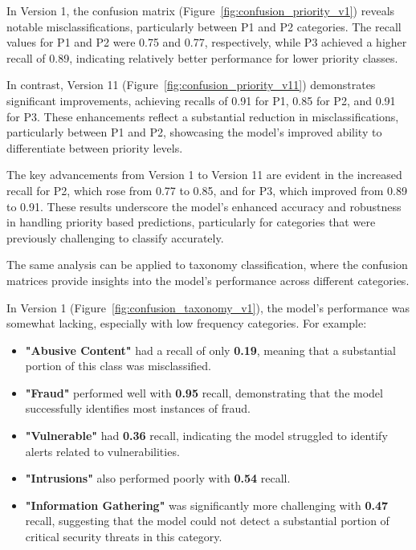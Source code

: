 In Version 1, the confusion matrix (Figure~\ref{fig:confusion_priority_v1}) reveals notable misclassifications, particularly between P1 and P2 categories. 
The recall values for P1 and P2 were 0.75 and 0.77, respectively, while P3 achieved a higher recall of 0.89, indicating relatively better performance for lower priority classes. 

In contrast, Version 11 (Figure~\ref{fig:confusion_priority_v11}) demonstrates significant improvements, achieving recalls of 0.91 for P1, 0.85 for P2, and 0.91 for P3. 
These enhancements reflect a substantial reduction in misclassifications, particularly between P1 and P2, showcasing the model's improved ability to differentiate between priority levels. 

The key advancements from Version 1 to Version 11 are evident in the increased recall for P2, which rose from 0.77 to 0.85, and for P3, which improved from 0.89 to 0.91. 
These results underscore the model's enhanced accuracy and robustness in handling priority based predictions, particularly for categories that were previously challenging to classify accurately.

The same analysis can be applied to taxonomy classification, where the confusion matrices provide insights into the model's performance across different categories.

In Version 1 (Figure~\ref{fig:confusion_taxonomy_v1}), the model's performance was somewhat lacking, especially with low frequency categories. 
For example:

\begin{itemize}
    \item \textbf{"Abusive Content"} had a recall of only \textbf{0.19}, meaning that a substantial portion of this class was misclassified.
    \item \textbf{"Fraud"} performed well with \textbf{0.95} recall, demonstrating that the model successfully identifies most instances of fraud.
    \item \textbf{"Vulnerable"} had \textbf{0.36} recall, indicating the model struggled to identify alerts related to vulnerabilities.
    \item \textbf{"Intrusions"} also performed poorly with \textbf{0.54} recall.
    \item \textbf{"Information Gathering"} was significantly more challenging with \textbf{0.47} recall, suggesting that the model could not detect a substantial portion of critical security threats in this category.
\end{itemize}

